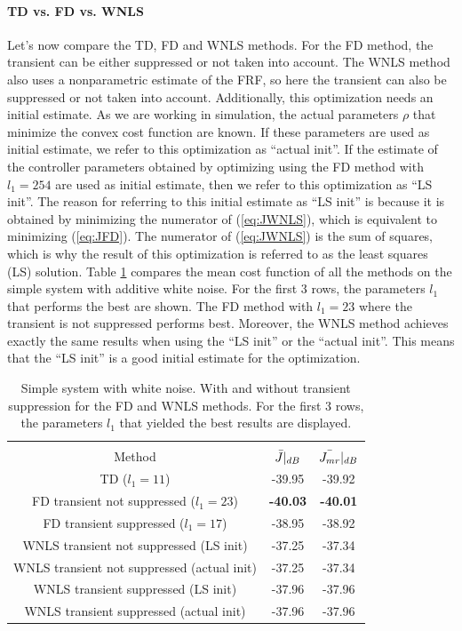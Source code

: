 \newpage
\paragraph{TD vs. FD vs. WNLS}
Let's now compare the TD, FD and WNLS methods. For the FD method, the transient can be either suppressed or not taken into account. The WNLS method also uses a nonparametric estimate of the FRF, so here the transient can also be suppressed or not taken into account. Additionally, this optimization needs an initial estimate. As we are working in simulation, the actual parameters $\rho$ that minimize the convex cost function are known. If these parameters are used as initial estimate, we refer to this optimization as ``actual init''. If the estimate of the controller parameters obtained by optimizing using the FD method with $l_1 = 254$ are used as initial estimate, then we refer to this optimization as ``LS init''. The reason for referring to this initial estimate as ``LS init'' is because it is obtained by minimizing the numerator of (\ref{eq:JWNLS}), which is equivalent to minimizing (\ref{eq:JFD}). The numerator of (\ref{eq:JWNLS}) is the sum of squares, which is why the result of this optimization is referred to as the least squares (LS) solution. Table \ref{tab:simple_white_transient_with_without_TD_vs_FD_vs_WNLS} compares the mean cost function of all the methods on the simple system with additive white noise. For the first 3 rows, the parameters $l_1$ that performs the best are shown. The FD method with $l_1 = 23$ where the transient is not suppressed performs best. Moreover, the WNLS method achieves exactly the same results when using the ``LS init'' or the ``actual init''. This means that the ``LS init'' is a good initial estimate for the optimization.

\begin{table}[H]
\centering
\begin{tabular}{|ccc|}
\hline
&&\\[-2.5ex]
Method & $\Bar{J}|_{dB}$ & $\Bar{J_{mr}}|_{dB}$ \\
\hline
TD ($l_1 = 11$) & -39.95 & -39.92 \\
FD transient not suppressed ($l_1 = 23$) & \textbf{-40.03} & \textbf{-40.01} \\
FD transient suppressed ($l_1 = 17$) & -38.95 & -38.92 \\
WNLS transient not suppressed (LS init) & -37.25 & -37.34 \\
WNLS transient not suppressed (actual init) & -37.25 & -37.34 \\
WNLS transient suppressed (LS init) & -37.96 & -37.96 \\
WNLS transient suppressed (actual init) & -37.96 & -37.96 \\
\hline
\end{tabular}
\caption{Simple system with white noise. With and without transient suppression for the FD and WNLS methods. For the first 3 rows, the parameters $l_1$ that yielded the best results are displayed.}
\label{tab:simple_white_transient_with_without_TD_vs_FD_vs_WNLS}
\end{table}

